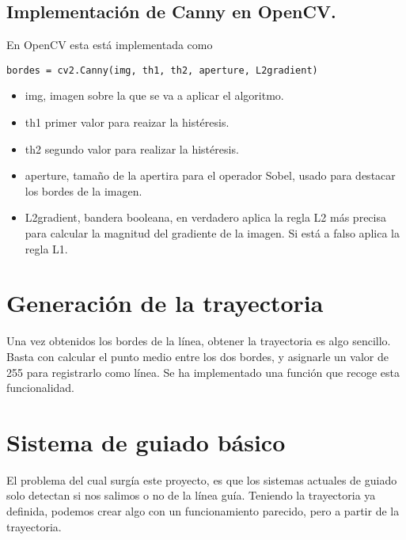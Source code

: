 \subsection{Implementación de Canny en OpenCV.}

En OpenCV esta está implementada como\cite{canny_doc}

\begin{verbatim}
bordes = cv2.Canny(img, th1, th2, aperture, L2gradient)
\end{verbatim}

\begin{itemize}

	\item img, imagen sobre la que se va a aplicar el algoritmo.
	
	\item th1 primer valor para reaizar la histéresis.
	
	\item th2 segundo valor para realizar la histéresis. 
	
	\item aperture, tamaño de la apertira para el operador Sobel, usado para destacar los bordes de la imagen.
	
	\item L2gradient, bandera booleana, en verdadero aplica la regla L2 más precisa para calcular la magnitud del gradiente de la imagen. Si está a falso aplica la regla L1.
	
\end{itemize}


\section{Generación de la trayectoria}
Una vez obtenidos los bordes de la línea, obtener la trayectoria es algo sencillo. Basta con calcular el punto medio entre los dos bordes, y asignarle un valor de 255 para registrarlo como línea. Se ha implementado una función que recoge esta funcionalidad. 


\section{Sistema de guiado básico}
El problema del cual surgía este proyecto, es que los sistemas actuales de guiado solo detectan si nos salimos o no de la línea guía. Teniendo la trayectoria ya definida, podemos crear algo con un funcionamiento parecido, pero a partir de la trayectoria. 

